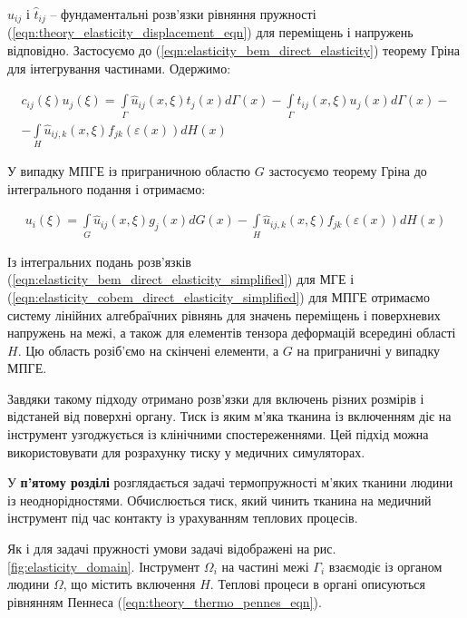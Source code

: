 \noindent$\hat{u}_{ij}$ і $\hat{t}_{ij}$ -- фундаментальні розв'язки рівняння пружності
(\ref{eqn:theory_elasticity_displacement_eqn}) для переміщень і напружень відповідно. Застосуємо до
(\ref{eqn:elasticity_bem_direct_elasticity}) теорему Гріна для інтегрування частинами. Одержимо:

\begin{equation}
  \label{eqn:elasticity_bem_direct_elasticity_simplified}
  \begin{split}
  c_{ij}(\xi) u_j(\xi) = \int \limits_{\Gamma}\hat{u}_{ij}(x,\xi)t_j(x)d\Gamma(x) - 
      \int \limits_{\Gamma}\hat{t}_{ij}(x,\xi)u_j(x)d\Gamma(x) - \\ 
      - \int \limits_H \hat{u}_{ij,k}(x,\xi)f_{jk}(\varepsilon(x))d H(x)
  \end{split}
\end{equation}

У випадку МПГЕ із приграничною областю $G$ застосуємо теорему Гріна до інтегрального подання і отримаємо: 

\begin{equation}
  \label{eqn:elasticity_cobem_direct_elasticity_simplified}
  \begin{split}
  u_i(\xi) = \int \limits_G \hat{u}_{ij}(x,\xi) g_j(x)d G(x)
      - \int \limits_H \hat{u}_{ij,k}(x,\xi)f_{jk}(\varepsilon(x))d H(x)
  \end{split}
\end{equation}

Із інтегральних подань розв'язків (\ref{eqn:elasticity_bem_direct_elasticity_simplified}) для МГЕ і
(\ref{eqn:elasticity_cobem_direct_elasticity_simplified}) для МПГЕ отримаємо систему лінійних алгебраїчних рівнянь для
значень переміщень і поверхневих напружень на межі, а також для елементів тензора деформацій всередині області $H$. Цю
область розіб'ємо на скінчені елементи, а $G$ на приграничні у випадку МПГЕ.

Завдяки такому підходу отримано розв'язки для включень різних розмірів і відстаней від поверхні органу. Тиск із 
яким м'яка тканина із включенням діє на інструмент узгоджується із клінічними спостереженнями. Цей підхід можна 
використовувати для розрахунку тиску у медичних симуляторах.

У \textbf{п'ятому розділі} розглядається задачі термопружності м'яких тканини людини із неоднорідностями. Обчислюється 
тиск, який чинить тканина на медичний інструмент під час контакту із урахуванням теплових процесів.

Як і для задачі пружності умови задачі відображені на рис. \ref{fig:elasticity_domain}. Інструмент $\Omega_i$ на частині
межі $\Gamma_i$ взаємодіє із органом людини $\Omega$, що містить включення $H$. Теплові процеси в органі описуються
рівнянням Пеннеса (\ref{eqn:theory_thermo_pennes_eqn}).  

